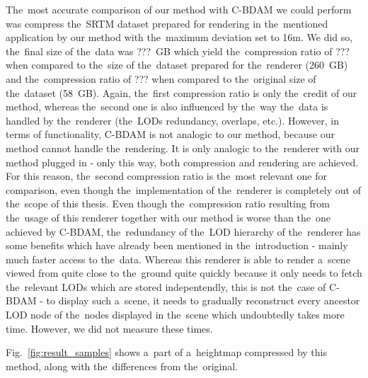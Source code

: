 The~most accurate comparison of our method with C-BDAM we could perform was compress the~SRTM dataset prepared for rendering in the~mentioned application by our method with the~maximum deviation set to 16m. We did so, the~final size of the~data was ???~GB which yield the~compression ratio of ??? when compared to the~size of the~dataset prepared for the~renderer (260~GB) and the~compression ratio of ??? when compared to the~original size of the~dataset (58~GB). Again, the~first compression ratio is only the~credit of our method, whereas the~second one is also influenced by the~way the~data is handled by the~renderer (the~LODs redundancy, overlaps, etc.). However, in terms of functionality, C-BDAM is not analogic to our method, because our method cannot handle the~rendering. It is only analogic to the~renderer with our method plugged in - only this way, both compression and rendering are achieved. For this reason, the~second compression ratio is the~most relevant one for comparison, even though the~implementation of the~renderer is completely out of the~scope of this thesis. Even though the~compression ratio resulting from the~usage of this renderer together with our method is worse than the~one achieved by C-BDAM, the~redundancy of the~LOD hierarchy of the~renderer has some benefits which have already been mentioned in the~introduction - mainly much faster access to the~data. Whereas this renderer is able to render a~scene viewed from quite close to the~ground quite quickly because it only needs to fetch the~relevant LODs which are stored indepentendly, this is not the~case of C-BDAM - to display such a~scene, it needs to gradually reconstruct every ancestor LOD node of the~nodes displayed in the~scene which undoubtedly takes more time. However, we did not measure these times. 

Fig.~\ref{fig:result_samples} shows a~part of a~heightmap compressed by this method, along with the~differences from the~original.

